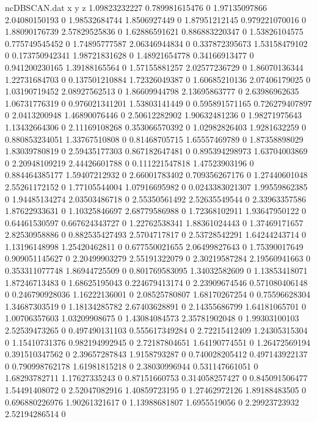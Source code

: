 \begin{filecontents}{ncDBSCAN.dat}
x y z
1.09823232227 0.789981615476 0
1.97135097866 2.04080150193 0
1.98532684744 1.8506927449 0
1.87951212145 0.979221070016 0
1.88090176739 2.57829525836 0
1.62886591621 0.886883220347 0
1.53826104575 0.775749545452 0
1.74895777587 2.06346944834 0
0.337872395673 1.53158479102 0
0.173750942341 1.98721831628 0
1.48921654778 0.34166913477 0
0.941200230165 1.39188165564 0
1.57155881257 2.02577236729 0
1.86070136344 1.22731684703 0
0.137501210884 1.72326049387 0
1.60685210136 2.07406179025 0
1.03190719452 2.08927562513 0
1.86609944798 2.13695863777 0
2.63986962635 1.06731776319 0
0.976021341201 1.53803141449 0
0.595891571165 0.726279407897 0
2.0413200948 1.46890076446 0
2.50612282902 1.90632481236 0
1.98271975643 1.13432664306 0
2.11169108268 0.353066570392 0
1.02982826403 1.9281632259 0
0.880853234051 1.33767510808 0
0.81468705715 1.65557469789 0
1.87358898029 1.83039780819 0
2.59435177303 0.867182647481 0
0.895394298973 1.63704003869 0
2.20948109219 2.44426601788 0
0.111221547818 1.47523903196 0
0.884464385177 1.59407212932 0
2.66001783402 0.709356267176 0
1.27440601048 2.55261172152 0
1.77105544004 1.07916695982 0
0.0243383021307 1.99559862385 0
1.94485134274 2.03503486718 0
2.55350561492 2.52635549544 0
2.33963357586 1.87622933631 0
1.10325846697 2.68779586988 0
1.72368102911 1.93647950122 0
0.64461530597 0.667624343727 0
1.22762538341 1.88361024443 0
1.37469171657 2.82530958886 0
0.882535427493 2.5704717817 0
2.53728542291 1.64244243714 0
1.13196148998 1.25420462811 0
0.677550021655 2.06499827643 0
1.75390017649 0.909051145627 0
2.20499903279 2.55191322079 0
2.30219587284 2.19560941663 0
0.353311077748 1.86944725509 0
0.801769583095 1.34032582609 0
1.13853418071 1.87246713483 0
1.68625195043 0.224679413174 0
2.23909674546 0.571080406148 0
0.246790928036 1.16222136001 0
2.08525780807 1.68170267254 0
0.75596628304 1.34687303519 0
1.18134285782 2.67403628891 0
2.14355686799 1.64181065701 0
1.00706357603 1.03209908675 0
1.43084084573 2.35781902048 0
1.99303100103 2.52539473265 0
0.497490131103 0.555617349284 0
2.72215412409 1.24305315304 0
1.15410731376 0.982194992945 0
2.72187804651 1.64190774551 0
1.26472569194 0.391510347562 0
2.39657287843 1.9158793287 0
0.740028205412 0.497143922137 0
0.790998762178 1.61981815218 0
2.38030996944 0.531147661051 0
1.68293782711 1.17627335243 0
0.87151660753 0.314058257427 0
0.845091506477 1.54491408072 0
2.52047082916 1.40859723195 0
1.27462972126 1.89188483505 0
0.696880226976 1.90261321617 0
1.13988681807 1.6955519056 0
2.29923723932 2.52194286514 0

\end{filecontents}

